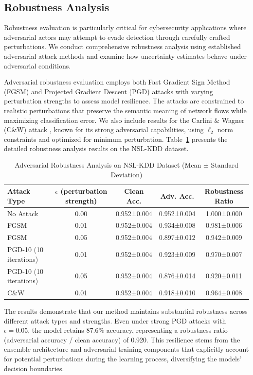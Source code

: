 \documentclass[journal]{IEEEtran}
\begin{document}
\subsection{Robustness Analysis}

Robustness evaluation is particularly critical for cybersecurity applications where adversarial actors may attempt to evade detection through carefully crafted perturbations. We conduct comprehensive robustness analysis using established adversarial attack methods and examine how uncertainty estimates behave under adversarial conditions.

Adversarial robustness evaluation employs both Fast Gradient Sign Method (FGSM) and Projected Gradient Descent (PGD) attacks with varying perturbation strengths to assess model resilience. The attacks are constrained to realistic perturbations that preserve the semantic meaning of network flows while maximizing classification error. We also include results for the Carlini \& Wagner (C\&W) attack \cite{carlini2017towards}, known for its strong adversarial capabilities, using $\ell_2$ norm constraints and optimized for minimum perturbation. Table~\ref{tab:adversarial} presents the detailed robustness analysis results on the NSL-KDD dataset.

\begin{table}[t]
\centering
\caption{Adversarial Robustness Analysis on NSL-KDD Dataset (Mean ± Standard Deviation)}
\label{tab:adversarial}
\begin{tabular}{@{}lcccc@{}}
\toprule
\textbf{Attack Type} & \textbf{$\epsilon$ (perturbation strength)} & \textbf{Clean Acc.} & \textbf{Adv. Acc.} & \textbf{Robustness Ratio} \\
\midrule
No Attack & 0.00 & 0.952±0.004 & 0.952±0.004 & 1.000±0.000 \\
FGSM & 0.01 & 0.952±0.004 & 0.934±0.008 & 0.981±0.006 \\
FGSM & 0.05 & 0.952±0.004 & 0.897±0.012 & 0.942±0.009 \\
PGD-10 (10 iterations) & 0.01 & 0.952±0.004 & 0.923±0.009 & 0.970±0.007 \\
PGD-10 (10 iterations) & 0.05 & 0.952±0.004 & 0.876±0.014 & 0.920±0.011 \\
C\&W & 0.01 & 0.952±0.004 & 0.918±0.010 & 0.964±0.008 \\
\bottomrule
\end{tabular}
\end{table}

The results demonstrate that our method maintains substantial robustness across different attack types and strengths. Even under strong PGD attacks with $\epsilon = 0.05$, the model retains 87.6\% accuracy, representing a robustness ratio (adversarial accuracy / clean accuracy) of 0.920. This resilience stems from the ensemble architecture and adversarial training components that explicitly account for potential perturbations during the learning process, diversifying the models' decision boundaries.
\end{document}
